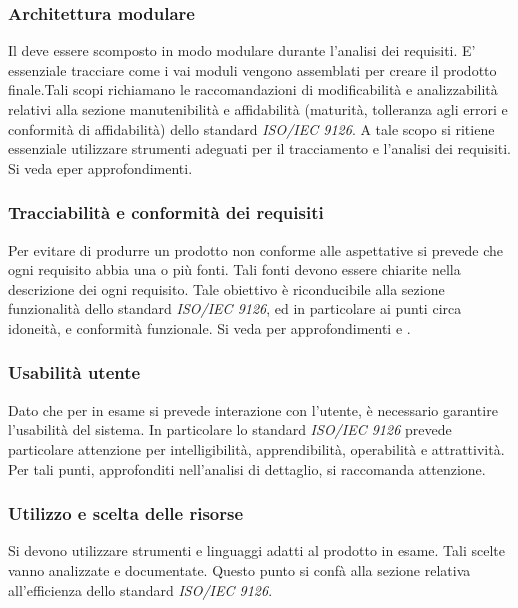 \documentclass[12pt,a4paper]{article}
\begin{document}
\subsubsection{Architettura modulare}
Il  deve essere scomposto in modo modulare durante l'analisi dei requisiti. E' essenziale tracciare come i vai moduli vengono assemblati per creare il prodotto finale.Tali scopi richiamano le raccomandazioni di modificabilità e analizzabilità relativi alla sezione manutenibilità e affidabilità (maturità, tolleranza agli errori e conformità di affidabilità) dello standard \textit{ISO/IEC 9126}. A tale scopo si ritiene essenziale utilizzare strumenti adeguati per il tracciamento e l'analisi dei requisiti. Si veda \NdP e\AdR per approfondimenti.
\subsubsection{Tracciabilità e conformità dei requisiti}
Per evitare di produrre un prodotto non conforme alle aspettative si prevede che ogni requisito  abbia una o più fonti. Tali fonti devono essere chiarite nella descrizione dei ogni requisito. Tale obiettivo è riconducibile alla sezione funzionalità dello standard  \textit{ISO/IEC 9126}, ed in particolare ai punti circa idoneità, e conformità funzionale. Si veda per approfondimenti \NdP e \AdR.
\subsubsection{Usabilità utente}
Dato che per  in esame si prevede interazione con l'utente, è necessario garantire l'usabilità del sistema. In particolare lo standard \textit{ISO/IEC 9126} prevede particolare attenzione per intelligibilità, apprendibilità, operabilità e attrattività. Per tali punti, approfonditi nell'analisi di dettaglio, si raccomanda attenzione.
\subsubsection{Utilizzo e scelta delle risorse}
Si devono utilizzare strumenti e linguaggi adatti al prodotto in esame. Tali scelte vanno analizzate e documentate. Questo punto si confà alla sezione relativa all'efficienza dello standard \textit{ISO/IEC 9126}.
\end{document}
